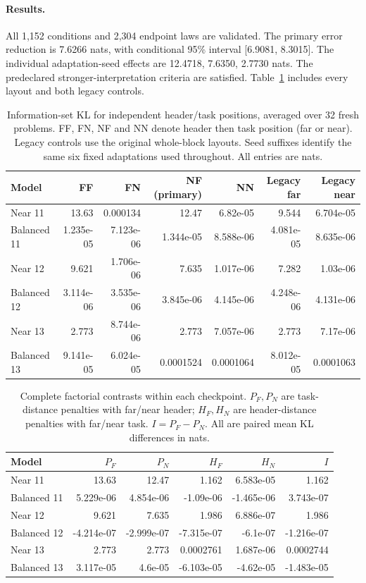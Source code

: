 \paragraph{Results.}
All 1,152 conditions and 2,304 endpoint laws are validated. The primary error reduction is 7.6266 nats, with conditional 95\% interval [6.9081, 8.3015].
The individual adaptation-seed effects are 12.4718, 7.6350, 2.7730 nats.
The predeclared stronger-interpretation criteria are satisfied.
Table~\ref{tab:header-distance} includes every layout and both legacy controls.
\begin{table}[t]
\centering\small
\caption{Information-set KL for independent header/task positions, averaged over 32 fresh problems. FF, FN, NF and NN denote header then task position (far or near). Legacy controls use the original whole-block layouts. Seed suffixes identify the same six fixed adaptations used throughout. All entries are nats.}
\label{tab:header-distance}
\begin{tabular}{lrrrrrr}
\toprule
Model & FF & FN & NF (primary) & NN & Legacy far & Legacy near\\
\midrule
Near 11 & 13.63 & 0.000134 & 12.47 & 6.82e-05 & 9.544 & 6.704e-05\\
Balanced 11 & 1.235e-05 & 7.123e-06 & 1.344e-05 & 8.588e-06 & 4.081e-05 & 8.635e-06\\
Near 12 & 9.621 & 1.706e-06 & 7.635 & 1.017e-06 & 7.282 & 1.03e-06\\
Balanced 12 & 3.114e-06 & 3.535e-06 & 3.845e-06 & 4.145e-06 & 4.248e-06 & 4.131e-06\\
Near 13 & 2.773 & 8.744e-06 & 2.773 & 7.057e-06 & 2.773 & 7.17e-06\\
Balanced 13 & 9.141e-05 & 6.024e-05 & 0.0001524 & 0.0001064 & 8.012e-05 & 0.0001063\\
\bottomrule
\end{tabular}
\end{table}
\begin{table}[t]
\centering\small
\caption{Complete factorial contrasts within each checkpoint. $P_F,P_N$ are task-distance penalties with far/near header; $H_F,H_N$ are header-distance penalties with far/near task. $I=P_F-P_N$. All are paired mean KL differences in nats.}
\label{tab:header-factorial}
\begin{tabular}{lrrrrr}
\toprule
Model & $P_F$ & $P_N$ & $H_F$ & $H_N$ & $I$\\
\midrule
Near 11 & 13.63 & 12.47 & 1.162 & 6.583e-05 & 1.162\\
Balanced 11 & 5.229e-06 & 4.854e-06 & -1.09e-06 & -1.465e-06 & 3.743e-07\\
Near 12 & 9.621 & 7.635 & 1.986 & 6.886e-07 & 1.986\\
Balanced 12 & -4.214e-07 & -2.999e-07 & -7.315e-07 & -6.1e-07 & -1.216e-07\\
Near 13 & 2.773 & 2.773 & 0.0002761 & 1.687e-06 & 0.0002744\\
Balanced 13 & 3.117e-05 & 4.6e-05 & -6.103e-05 & -4.62e-05 & -1.483e-05\\
\bottomrule
\end{tabular}
\end{table}
